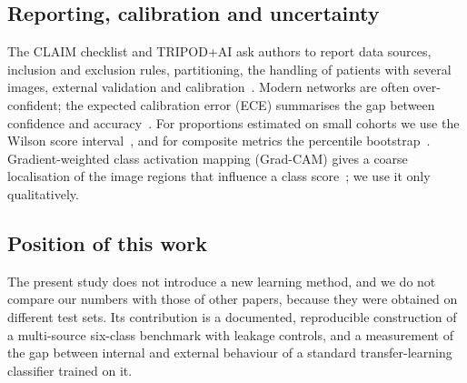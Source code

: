 \subsection{Reporting, calibration and uncertainty}
The CLAIM checklist and TRIPOD+AI ask authors to report data sources, inclusion and exclusion rules, partitioning, the handling of patients with several images, external validation and calibration~\cite{mongan2020claim,collins2024tripodai}. Modern networks are often over-confident; the expected calibration error (ECE) summarises the gap between confidence and accuracy~\cite{naeini2015obtaining,guo2017calibration}. For proportions estimated on small cohorts we use the Wilson score interval~\cite{wilson1927probable}, and for composite metrics the percentile bootstrap~\cite{efron1994introduction}. Gradient-weighted class activation mapping (Grad-CAM) gives a coarse localisation of the image regions that influence a class score~\cite{selvaraju2017gradcam}; we use it only qualitatively.

\subsection{Position of this work}
The present study does not introduce a new learning method, and we do not compare our numbers with those of other papers, because they were obtained on different test sets. Its contribution is a documented, reproducible construction of a multi-source six-class benchmark with leakage controls, and a measurement of the gap between internal and external behaviour of a standard transfer-learning classifier trained on it.
